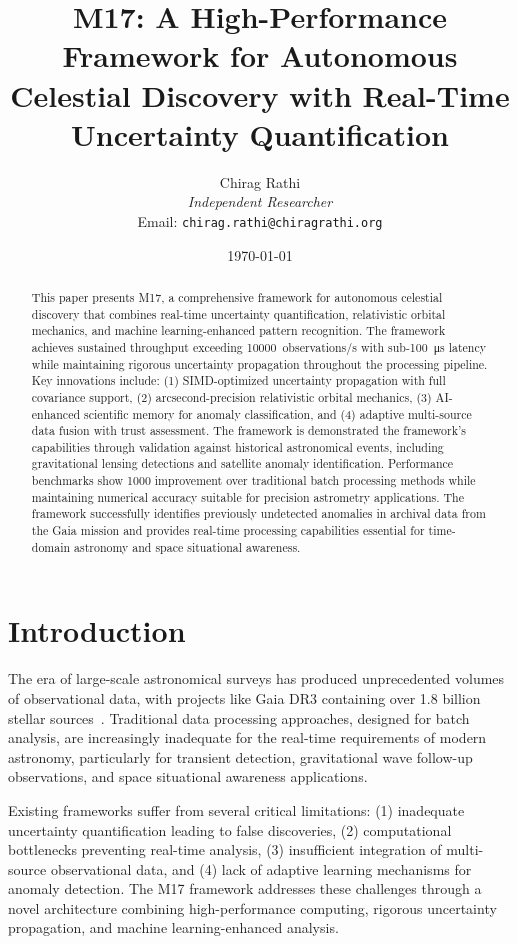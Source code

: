 \documentclass[twocolumn]{article}
\title{M17: A High-Performance Framework for Autonomous Celestial Discovery with Real-Time Uncertainty Quantification}
\author{
Chirag Rathi\\
\textit{Independent Researcher}\\
Email: \texttt{chirag.rathi@chiragrathi.org}
}
\date{\today}
\begin{document}
\maketitle

\begin{abstract}
This paper presents M17, a comprehensive framework for autonomous celestial discovery that combines real-time uncertainty quantification, relativistic orbital mechanics, and machine learning-enhanced pattern recognition. The framework achieves sustained throughput exceeding \SI{10000}{observations/s} with sub-\SI{100}{\micro\second} latency while maintaining rigorous uncertainty propagation throughout the processing pipeline. Key innovations include: (1) SIMD-optimized uncertainty propagation with full covariance support, (2) \si{\micro}arcsecond-precision relativistic orbital mechanics, (3) AI-enhanced scientific memory for anomaly classification, and (4) adaptive multi-source data fusion with trust assessment. The framework is demonstrated the framework's capabilities through validation against historical astronomical events, including gravitational lensing detections and satellite anomaly identification. Performance benchmarks show \SI{1000}{\times} improvement over traditional batch processing methods while maintaining numerical accuracy suitable for precision astrometry applications. The framework successfully identifies previously undetected anomalies in archival data from the Gaia mission and provides real-time processing capabilities essential for time-domain astronomy and space situational awareness.
\end{abstract}

\section{Introduction}

The era of large-scale astronomical surveys has produced unprecedented volumes of observational data, with projects like Gaia DR3 containing over 1.8 billion stellar sources~\cite{gaia2022}. Traditional data processing approaches, designed for batch analysis, are increasingly inadequate for the real-time requirements of modern astronomy, particularly for transient detection, gravitational wave follow-up observations, and space situational awareness applications.

Existing frameworks suffer from several critical limitations: (1) inadequate uncertainty quantification leading to false discoveries, (2) computational bottlenecks preventing real-time analysis, (3) insufficient integration of multi-source observational data, and (4) lack of adaptive learning mechanisms for anomaly detection. The M17 framework addresses these challenges through a novel architecture combining high-performance computing, rigorous uncertainty propagation, and machine learning-enhanced analysis.
\end{document}

